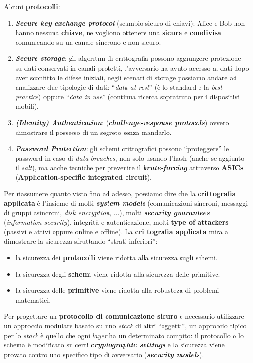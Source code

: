Alcuni \textbf{protocolli}:
\begin{enumerate}[nosep]
    \item \textbf{\textit{Secure key exchange protocol}} (scambio sicuro di chiavi): Alice e Bob non hanno nessuna \textbf{chiave}, ne vogliono ottenere una \textbf{sicura} e \textbf{condivisa} comunicando su un canale sincrono e non sicuro.
    \item \textbf{\textit{Secure storage}}: gli algoritmi di crittografia possono aggiungere protezione su dati conservati in canali protetti, l'avversario ha avuto accesso ai dati dopo aver sconfitto le difese iniziali, negli scenari di storage possiamo andare ad analizzare due tipologie di dati: ``\textit{data at rest}'' (è lo standard e la \textit{best-practice}) oppure ``\textit{data in use}'' (continua ricerca soprattuto per i dispositivi mobili).
    \item \textbf{\textit{(Identity) Authentication}}: (\textbf{\textit{challenge-response protocols}}) ovvero dimostrare il possesso di un segreto senza mandarlo.
    \item \textbf{\textit{Password Protection}}: gli schemi crittografici possono ``proteggere'' le password in caso di \textit{data breaches}, non solo usando l'hash (anche se aggiunto il \textit{salt}), ma anche tecniche per prevenire il \textbf{\textit{brute-forcing}} attraverso \textbf{ASICs} (\textbf{Application-specific integrated circuit}).
\end{enumerate}
Per riassumere quanto visto fino ad adesso, possiamo dire che la \textbf{crittografia applicata} è l'insieme di molti \textbf{\textit{system models}} (comunicazioni sincroni, messaggi di gruppi asincroni, \textit{disk encryption}, ...), molti \textbf{\textit{security guarantees}} (\textit{information security}), integrità e autenticazione, molti \textbf{\textbf{type of attackers}} (passivi e attivi oppure online e offline). La \textbf{crittografia applicata} mira a dimostrare la sicurezza sfruttando ``strati inferiori'':
\begin{itemize}[nosep]
    \item la sicurezza dei \textbf{protocolli} viene ridotta alla sicurezza sugli schemi.
    \item la sicurezza degli \textbf{schemi} viene ridotta alla sicurezza delle primitive.
    \item la sicurezza delle \textbf{primitive} viene ridotta alla robusteza di problemi matematici.
\end{itemize}
Per progettare un \textbf{protocollo di comunicazione sicuro} è necessario utilizzare un approccio modulare basato su uno \textit{stack} di altri ``oggetti'', un approccio tipico per lo \textit{stack} è quello che ogni \textit{layer} ha un determinato compito: il protocollo o lo schema è modificato su certi \textbf{\textit{cryptographic settings}} e la sicurezza viene provato contro uno specifico tipo di avversario (\textbf{\textit{security models}}).